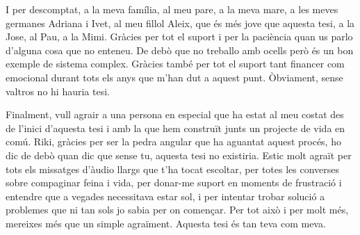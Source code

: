 I per descomptat, a la meva família, al meu pare, a la meva mare, a les meves germanes Adriana i Ivet, al meu fillol Aleix, que és més jove que aquesta tesi, a la Jose, al Pau, a la Mimi. Gràcies per tot el suport i per la paciència quan us parlo d'alguna cosa que no enteneu. De debò que no treballo amb ocells però és un bon exemple de sistema complex. Gràcies també per tot el suport tant financer com emocional durant tots els anys que m'han dut a aquest punt. Òbviament, sense valtros no hi hauria tesi.

Finalment, vull agrair a una persona en especial que ha estat al meu costat des de l'inici d'aquesta tesi i amb la que hem construït junts un projecte de vida en comú. Riki, gràcies per ser la pedra angular que ha aguantat aquest procés, ho dic de debò quan dic que sense tu, aquesta tesi no existiria. Estic molt agraït per tots els missatges d'àudio llargs que t'ha tocat escoltar, per totes les converses sobre compaginar feina i vida, per donar-me suport en moments de frustració i entendre que a vegades necessitava estar sol, i per intentar trobar solució a problemes que ni tan sols jo sabia per on començar. Per tot això i per molt més, mereixes més que un simple agraïment. Aquesta tesi és tan teva com meva.


\thispagestyle{empty}


\vfill